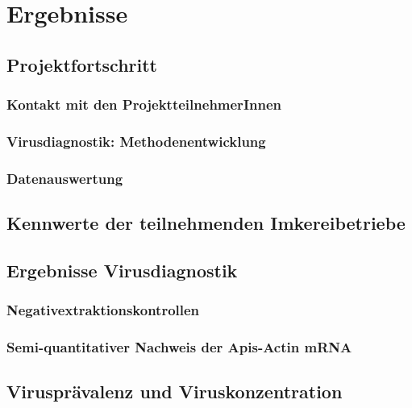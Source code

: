 \section{Ergebnisse}

\subsection{Projektfortschritt}
\subsubsection{Kontakt mit den ProjektteilnehmerInnen}

\blindtext

\subsubsection{Virusdiagnostik: Methodenentwicklung}

\blindtext

\subsubsection{Datenauswertung}

\blindtext

\subsection{Kennwerte der teilnehmenden Imkereibetriebe}

\blindtext

\subsection{Ergebnisse Virusdiagnostik}

\blindtext

\subsubsection{Negativextraktionskontrollen}

\blindtext

\subsubsection{Semi-quantitativer Nachweis der Apis-Actin mRNA}

\blindtext

\subsection{Virusprävalenz und Viruskonzentration}

